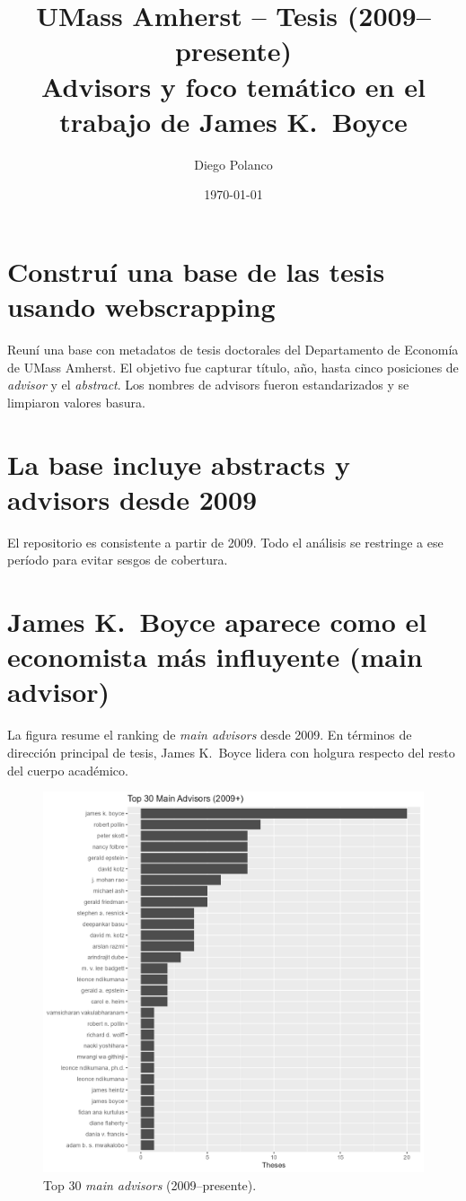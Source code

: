 \documentclass[12pt]{article}
\title{UMass Amherst -- Tesis (2009--presente)\\
	\large Advisors y foco temático en el trabajo de James K.~Boyce}
\author{Diego Polanco}
\date{\today}
\begin{document}
	\maketitle
	
	\section{Construí una base de las tesis usando webscrapping}
	Reuní una base con metadatos de tesis doctorales del Departamento de Economía de UMass Amherst. El objetivo fue capturar título, año, hasta cinco posiciones de \textit{advisor} y el \textit{abstract}. Los nombres de advisors fueron estandarizados y se limpiaron valores basura.
	
	\section{La base incluye abstracts y advisors desde 2009}
	El repositorio es consistente a partir de 2009. Todo el análisis se restringe a ese período para evitar sesgos de cobertura.
	
	\section{James K.~Boyce aparece como el economista más influyente (main advisor)}
	La figura resume el ranking de \textit{main advisors} desde 2009. En términos de dirección principal de tesis, James K.~Boyce lidera con holgura respecto del resto del cuerpo académico.
	
	\begin{figure}[H]\centering
		\includegraphics[width=\linewidth]{top_main_advisors.png}
		\caption{Top 30 \textit{main advisors} (2009--presente).}
	\end{figure}
	
\end{document}
